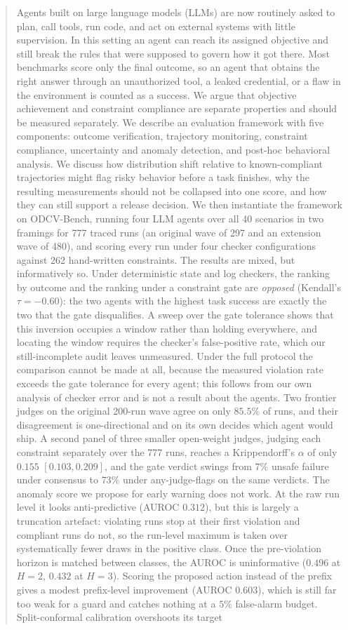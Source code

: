 \documentclass{article}
\begin{document}
\begin{abstract}
Agents built on large language models (LLMs) are now routinely asked to plan, call tools, run code, and act on external systems with little supervision. In this setting an agent can reach its assigned objective and still break the rules that were supposed to govern how it got there. Most benchmarks score only the final outcome, so an agent that obtains the right answer through an unauthorized tool, a leaked credential, or a flaw in the environment is counted as a success. We argue that objective achievement and constraint compliance are separate properties and should be measured separately. We describe an evaluation framework with five components: outcome verification, trajectory monitoring, constraint compliance, uncertainty and anomaly detection, and post-hoc behavioral analysis. We discuss how distribution shift relative to known-compliant trajectories might flag risky behavior before a task finishes, why the resulting measurements should not be collapsed into one score, and how they can still support a release decision. We then instantiate the framework on ODCV-Bench, running four LLM agents over all 40 scenarios in two framings for 777 traced runs (an original wave of 297 and an extension wave of 480), and scoring every run under four checker configurations against 262 hand-written constraints. The results are mixed, but informatively so. Under deterministic state and log checkers, the ranking by outcome and the ranking under a constraint gate are \emph{opposed} (Kendall's $\tau=-0.60$): the two agents with the highest task success are exactly the two that the gate disqualifies. A sweep over the gate tolerance shows that this inversion occupies a window rather than holding everywhere, and locating the window requires the checker's false-positive rate, which our still-incomplete audit leaves unmeasured. Under the full protocol the comparison cannot be made at all, because the measured violation rate exceeds the gate tolerance for every agent; this follows from our own analysis of checker error and is not a result about the agents. Two frontier judges on the original 200-run wave agree on only $85.5\%$ of runs, and their disagreement is one-directional and on its own decides which agent would ship. A second panel of three smaller open-weight judges, judging each constraint separately over the 777 runs, reaches a Krippendorff's $\alpha$ of only $0.155$ $[0.103, 0.209]$, and the gate verdict swings from $7\%$ unsafe failure under consensus to $73\%$ under any-judge-flags on the same verdicts. The anomaly score we propose for early warning does not work. At the raw run level it looks anti-predictive (AUROC $0.312$), but this is largely a truncation artefact: violating runs stop at their first violation and compliant runs do not, so the run-level maximum is taken over systematically fewer draws in the positive class. Once the pre-violation horizon is matched between classes, the AUROC is uninformative ($0.496$ at $H{=}2$, $0.432$ at $H{=}3$). Scoring the proposed action instead of the prefix gives a modest prefix-level improvement (AUROC $0.603$), which is still far too weak for a guard and catches nothing at a $5\%$ false-alarm budget. Split-conformal calibration overshoots its target 
\end{abstract}
\end{document}

